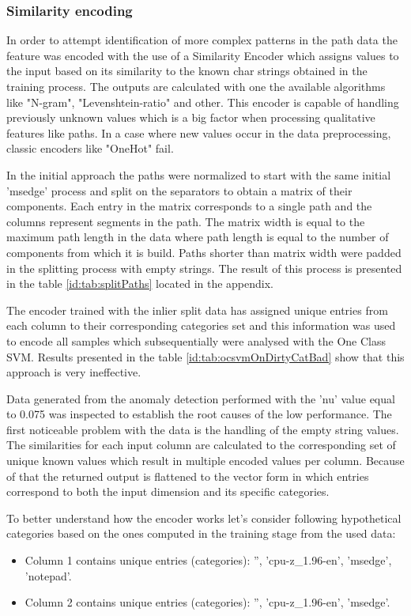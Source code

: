 \documentclass[a4paper,twoside,12pt]{book}
\begin{document}
\subsubsection{Similarity encoding}

In order to attempt identification of more complex patterns in the path data the feature was encoded with
the use of a Similarity Encoder which assigns values to the input based on its similarity 
to the known char strings obtained in the training process. The outputs are calculated with 
one the available algorithms like "N-gram", "Levenshtein-ratio" and other. This encoder is
capable of handling previously unknown values which is a big factor when processing 
qualitative features like paths. In a case where new values occur in the data preprocessing,
classic encoders like "OneHot" fail. 

In the initial approach the paths were normalized to start with the same initial 'msedge' 
process and split on the separators to obtain a matrix of their components. Each entry in the
matrix corresponds to a single path and the columns represent segments in the path. The matrix
width is equal to the maximum path length in the data where path length is equal to the number
of components from which it is build. Paths shorter than matrix width were padded in the splitting
process with empty strings. The result of this process is presented in the table \ref{id:tab:splitPaths} 
located in the appendix. 

The encoder trained with the inlier split data has assigned unique entries from each column to their 
corresponding categories set and this 
information was used to encode all samples which subsequentially were analysed with the One Class
SVM. Results presented in the table \ref{id:tab:ocsvmOnDirtyCatBad} show that this approach is 
very ineffective. 

Data generated from the anomaly detection performed with the 'nu' value equal to 0.075 was inspected 
to establish the root causes of the low performance. The first noticeable problem with the data
is the handling of the empty string values. The similarities for each input column are 
calculated to the corresponding set of unique known values which result in multiple encoded values per
column. Because of that the returned output is flattened to the vector form in which entries
correspond to both the input dimension and its specific categories. 

To better understand how the encoder works let's consider following hypothetical categories based on the ones computed 
in the training stage from the used data:
\begin{itemize}
	\item Column 1 contains unique entries (categories): '', 'cpu-z\_1.96-en', 'msedge', 'notepad'.
	\item Column 2 contains unique entries (categories): '', 'cpu-z\_1.96-en', 'msedge'.
\end{itemize}
\end{document}
